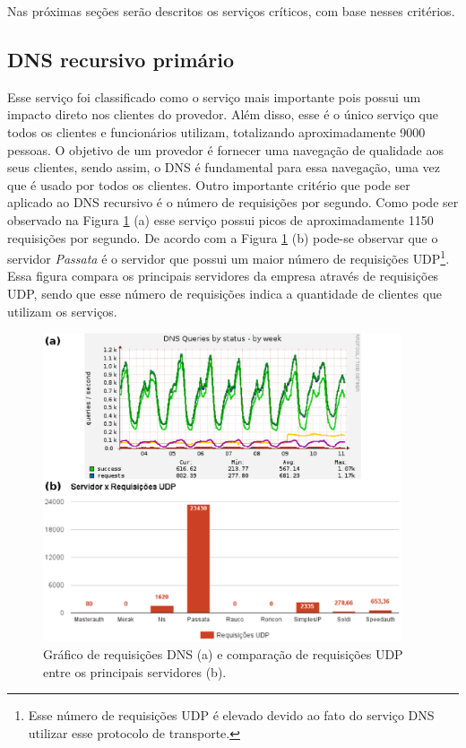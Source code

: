 Nas próximas seções serão descritos os serviços críticos, com base nesses critérios.

\subsection{DNS recursivo primário}
\label{section:dnsrecprim}

Esse serviço foi classificado como o serviço mais importante pois possui um impacto direto nos clientes do provedor. Além disso, esse é o único 
serviço que todos os clientes e funcionários utilizam, totalizando aproximadamente 9000 pessoas. O objetivo de um provedor é fornecer uma navegação 
de qualidade aos seus clientes, sendo assim, o \ac{DNS} é fundamental para essa navegação, uma vez que é usado por todos os clientes. Outro 
importante critério que pode ser aplicado ao \ac{DNS} recursivo é o número de requisições por segundo. Como pode ser observado na Figura 
\ref{fig:dns_udp} (a) esse serviço possui picos de aproximadamente 1150 requisições por segundo. De acordo com a Figura \ref{fig:dns_udp} (b) 
pode-se observar que o servidor \textit{Passata} é o servidor que possui um maior número de requisições \ac{UDP}\footnote[1]{Esse número de 
requisições \ac{UDP} é elevado devido ao fato do serviço \ac{DNS} utilizar esse protocolo de transporte.}. Essa figura compara os principais 
servidores da empresa através de requisições \ac{UDP}, sendo que esse número de requisições indica a quantidade de clientes que utilizam os 
serviços.

\begin{figure}[h!]
 \centering
 \includegraphics[width=400px]{img/dns_udp.eps}
 \caption{Gráfico de requisições DNS (a) e comparação de requisições UDP entre os principais servidores (b).}
 \label{fig:dns_udp}
\end{figure}


